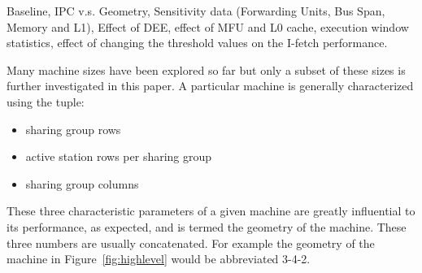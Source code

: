 \documentclass[10pt,twocolumn]{IEEEtran}
\begin{document}
Baseline, IPC v.s. Geometry, Sensitivity data (Forwarding Units, Bus
Span, Memory and L1), Effect of DEE, effect of MFU and L0 cache,
execution window statistics, effect of changing the threshold values on
the I-fetch performance.

Many machine sizes have been explored so far but only a subset of these
sizes is further investigated in this paper. A particular machine is
generally characterized using the tuple:

\begin{itemize}
\item sharing group rows
\item active station rows per sharing group
\item sharing group columns
\end{itemize}

These three characteristic parameters of a given machine are greatly
influential to its performance, as expected, and is termed the geometry
of the machine. These three numbers are usually concatenated.  For
example the geometry of the machine in Figure~\ref{fig:highlevel}
would be abbreviated 3-4-2.




%
\end{document}
